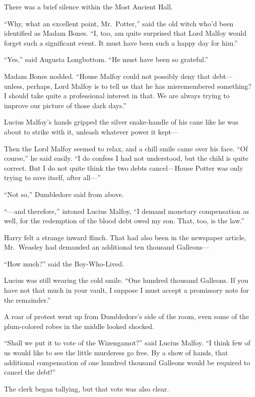 There was a brief silence within the Most Ancient Hall.

``Why, what an excellent point, Mr.~Potter,'' said the old witch who'd
been identified as Madam Bones. ``I, too, am quite surprised that Lord
Malfoy would forget such a significant event. It must have been such a
happy day for him.''

``Yes,'' said Augusta Longbottom. ``He must have been so grateful.''

Madam Bones nodded. ``House Malfoy could not possibly deny that debt---
unless, perhaps, Lord Malfoy is to tell us that he has misremembered
something? I should take quite a professional interest in that. We are
always trying to improve our picture of those dark days.''

Lucius Malfoy's hands gripped the silver snake-handle of his cane like
he was about to strike with it, unleash whatever power it kept---

Then the Lord Malfoy seemed to relax, and a chill smile came over his
face. ``Of course,'' he said easily. ``I do confess I had not
understood, but the child is quite correct. But I do not quite think the
two debts cancel---House Potter was only trying to save itself, after
all---''

``Not so,'' Dumbledore said from above.

``---and therefore,'' intoned Lucius Malfoy, ``I demand monetary
compensation as well, for the redemption of the blood debt owed my son.
That, too, is the law.''

Harry felt a strange inward flinch. That had also been in the newspaper
article, Mr.~Weasley had demanded an additional ten thousand Galleons---

``How much?'' said the Boy-Who-Lived.

Lucius was still wearing the cold smile. ``One hundred thousand
Galleons. If you have not that much in your vault, I suppose I must
accept a promissory note for the remainder.''

A roar of protest went up from Dumbledore's side of the room, even some
of the plum-colored robes in the middle looked shocked.

``Shall we put it to vote of the Wizengamot?'' said Lucius Malfoy. ``I
think few of us would like to see the little murderess go free. By a
show of hands, that additional compensation of one hundred thousand
Galleons would be required to cancel the debt!''

The clerk began tallying, but that vote was also clear.


